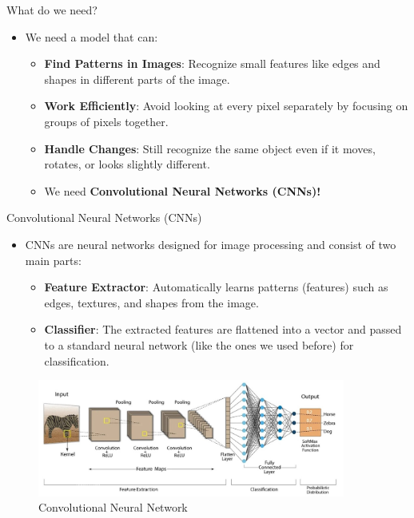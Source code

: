 \documentclass[10pt]{beamer}
\theoremstyle{remark}
\theoremstyle{definition}
\begin{document}
\begin{frame}{What do we need?}
\begin{itemize}
    \item We need a model that can:
    \begin{itemize}
        \item \textbf{Find Patterns in Images}: Recognize small features like edges and shapes in different parts of the image.
        \item \textbf{Work Efficiently}: Avoid looking at every pixel separately by focusing on groups of pixels together.
        \item \textbf{Handle Changes}: Still recognize the same object even if it moves, rotates, or looks slightly different.
        \item We need \textbf{Convolutional Neural Networks (CNNs)!}

    \end{itemize}
\end{itemize}


\end{frame}

\framebreak

\begin{frame}{Convolutional Neural Networks (CNNs)}

\begin{itemize}
        \item CNNs are neural networks designed for image processing and consist of two main parts:

        \begin{itemize}
            \item \textbf{Feature Extractor}: Automatically learns patterns (features) such as edges, textures, and shapes from the image.
            \item \textbf{Classifier}: The extracted features are flattened into a vector and passed to a standard neural network (like the ones we used before) for classification.
    \end{itemize}
\end{itemize}

\begin{figure}
        \centering
        \includegraphics[width=0.9\textwidth,height=0.7\textheight,keepaspectratio]{./images/cnn_arch.jpeg}
        \caption{Convolutional Neural Network}

        \end{figure}
\end{frame}
\end{document}
